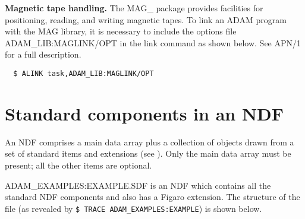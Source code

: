 \begin{description}
\item{\bf Magnetic tape handling.}
The MAG\_ package provides facilities for positioning, reading, and writing
magnetic tapes.
To link an ADAM program with the MAG  library, it is necessary to  
include the options file
ADAM\_LIB:MAGLINK/OPT in the link command as shown below.  
See APN/1 for a full 
description.
\begin{verbatim}
  $ ALINK task,ADAM_LIB:MAGLINK/OPT
\end{verbatim}

\end{description}
\newpage

\appendix
\section{Standard components in an NDF\label{apxndf}}

An NDF comprises a main data array plus a collection of objects drawn from 
a set of standard items and extensions (see ).
Only the main data array must be present; all the other items are optional.

ADAM\_EXAMPLES:EXAMPLE.SDF is an NDF which contains all the standard 
NDF components and also has a Figaro extension.
The structure of the file 
(as revealed by {\tt \$ TRACE ADAM\_EXAMPLES:EXAMPLE}) is shown below.


